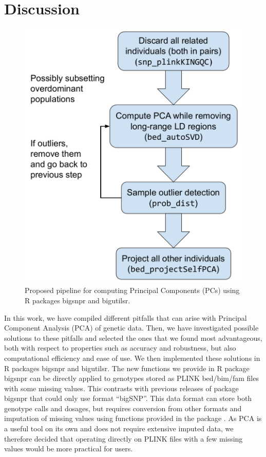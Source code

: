 \documentclass{bioinfo}
\begin{document}

\section{Discussion}

\begin{figure}[htb]
\centerline{\includegraphics[width=0.8\linewidth]{PCA-pipeline.pdf}}
\caption{Proposed pipeline for computing Principal Components (PCs) using R packages bigsnpr and bigutilsr.
\label{fig:pipeline}}
\end{figure}

In this work, we have compiled different pitfalls that can arise with Principal Component Analysis (PCA) of genetic data. Then, we have investigated possible solutions to these pitfalls and selected the ones that we found most advantageous, both with respect to properties such as accuracy and robustness, but also computational efficiency and ease of use. 
We then implemented these solutions in R packages bigsnpr and bigutilsr. 
The new functions we provide in R package bigsnpr can be directly applied to genotypes stored as PLINK bed/bim/fam files with some missing values.
This contrasts with previous releases of package bigsnpr that could only use format ``bigSNP''. This data format can store both genotype calls and dosages, but requires conversion from other formats and imputation of missing values using functions provided in the package \cite[]{prive2017efficient}.
As PCA is a useful tool on its own and does not require extensive imputed data, we therefore decided that operating directly on PLINK files with a few missing values would be more practical for users.
\end{document}
